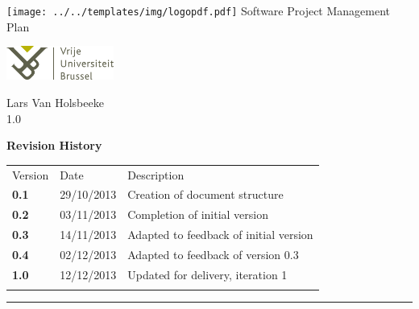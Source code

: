 \documentclass[12pt]{article}
\newcommand{\DocumentName}{Software Project Management Plan}
\newcommand{\Title}{\DocumentName \\ \hfill}
\newcommand{\Author}{Lars Van Holsbeeke}
\newcommand{\Version}{1.0}
\begin{document}
\begin{titlepage}

\begin{center}
\texttt{[image: ../../templates/img/logopdf.pdf]}
\vfill
{\Huge \Title}
\hfill
\vfill
\vfill
\end{center}

\begin{minipage}[t]{1\textwidth}
\begin{flushleft}
\includegraphics[width=100pt]{../../templates/img/VUB_logo_compact.jpg}
\end{flushleft}
\end{minipage}

\begin{minipage}[t]{1\textwidth}
\begin{flushright}
\Author \\
\Version \\
\end{flushright}
\end{minipage}

\end{titlepage}


\textbf{Revision History}

\begin{longtable}[c]{@{}lll@{}}
\hline\noalign{\medskip}
Version & Date & Description
\\\noalign{\medskip}
\hline\noalign{\medskip}
\textbf{0.1} & 29/10/2013 & Creation of document structure
\\\noalign{\medskip}
\textbf{0.2} & 03/11/2013 & Completion of initial version
\\\noalign{\medskip}
\textbf{0.3} & 14/11/2013 & Adapted to feedback of initial version
\\\noalign{\medskip}
\textbf{0.4} & 02/12/2013 & Adapted to feedback of version 0.3
\\\noalign{\medskip}
\textbf{1.0} & 12/12/2013 & Updated for delivery, iteration 1
\\\noalign{\medskip}
\hline
\end{longtable}

\begin{center}\rule{3in}{0.4pt}\end{center}

\clearpage

\tableofcontents
\end{document}
